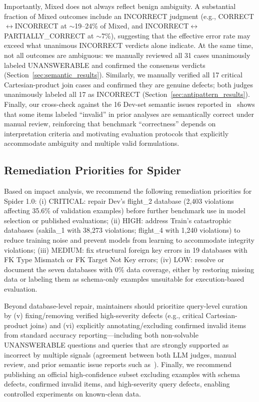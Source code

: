 \documentclass[]{einformatica}
\begin{document}
Importantly, Mixed does not always reflect benign ambiguity. A substantial fraction of Mixed outcomes include an INCORRECT judgment (e.g., CORRECT$\leftrightarrow$INCORRECT at $\sim$19--24\% of Mixed, and INCORRECT$\leftrightarrow$PARTIALLY\_CORRECT at $\sim$7\%), suggesting that the effective error rate may exceed what unanimous INCORRECT verdicts alone indicate. At the same time, not all outcomes are ambiguous: we manually reviewed all 31 cases unanimously labeled UNANSWERABLE and confirmed the consensus verdicts (Section~\ref{sec:semantic_results}). Similarly, we manually verified all 17 critical Cartesian-product join cases and confirmed they are genuine defects; both judges unanimously labeled all 17 as INCORRECT (Section~\ref{sec:antipattern_results}). Finally, our cross-check against the 16 Dev-set semantic issues reported in~\cite{liu2025nl2sqlbugs} shows that some items labeled ``invalid'' in prior analyses are semantically correct under manual review, reinforcing that benchmark ``correctness'' depends on interpretation criteria and motivating evaluation protocols that explicitly accommodate ambiguity and multiple valid formulations.

\subsection{Remediation Priorities for Spider}

Based on impact analysis, we recommend the following remediation priorities for Spider 1.0: (i) CRITICAL: repair Dev's flight\_2 database (2,403 violations affecting 35.6\% of validation examples) before further benchmark use in model selection or published evaluations; (ii) HIGH: address Train's catastrophic databases (sakila\_1 with 38,273 violations; flight\_4 with 1,240 violations) to reduce training noise and prevent models from learning to accommodate integrity violations; (iii) MEDIUM: fix structural foreign key errors in 19 databases with FK Type Mismatch or FK Target Not Key errors; (iv) LOW: resolve or document the seven databases with 0\% data coverage, either by restoring missing data or labeling them as schema-only examples unsuitable for execution-based evaluation.

Beyond database-level repair, maintainers should prioritize query-level curation by (v) fixing/removing verified high-severity defects (e.g., critical Cartesian-product joins) and (vi) explicitly annotating/excluding confirmed invalid items from standard accuracy reporting---including both non-solvable UNANSWERABLE questions and queries that are strongly supported as incorrect by multiple signals (agreement between both LLM judges, manual review, and prior semantic issue reports such as~\cite{liu2025nl2sqlbugs}). Finally, we recommend publishing an official high-confidence subset excluding examples with schema defects, confirmed invalid items, and high-severity query defects, enabling controlled experiments on known-clean data.
\end{document}
